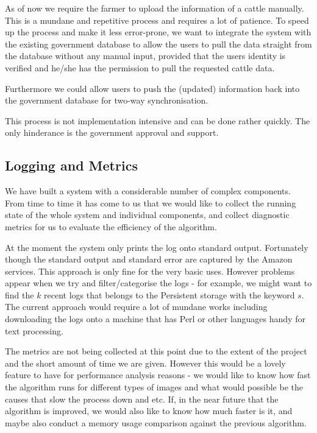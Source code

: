As of now we require the farmer to upload the information of a cattle manually. This is a mundane and repetitive process and requires a lot of patience. To speed up the process and make it less error-prone, we want to integrate the system with the existing government database to allow the users to pull the data straight from the database without any manual input, provided that the users identity is verified and he/she has the permission to pull the requested cattle data.

Furthermore we could allow users to push the (updated) information back into the government database for two-way synchronisation.

This process is not implementation intensive and can be done rather quickly. The only hinderance is the government approval and support.

\subsection{Logging and Metrics}

We have built a system with a considerable number of complex components. From time to time it has come to us that we would like to collect the running state of the whole system and individual components, and collect diagnostic metrics for us to evaluate the efficiency of the algorithm.

At the moment the system only prints the log onto standard output. Fortunately though the standard output and standard error are captured by the Amazon services. This approach is only fine for the very basic uses. However problems appear when we try and filter/categorise the logs - for example, we might want to find the $k$ recent logs that belongs to the Persistent storage with the keyword $s$. The current approach would require a lot of mundane works including downloading the logs onto a machine that has Perl or other languages handy for text processing.

The metrics are not being collected at this point due to the extent of the project and the short amount of time we are given. However this would be a lovely feature to have for performance analysis reasons - we would like to know how fast the algorithm runs for different types of images and what would possible be the causes that slow the process down and etc. If, in the near future that the algorithm is improved, we would also like to know how much faster is it, and maybe also conduct a memory usage comparison against the previous algorithm. 

